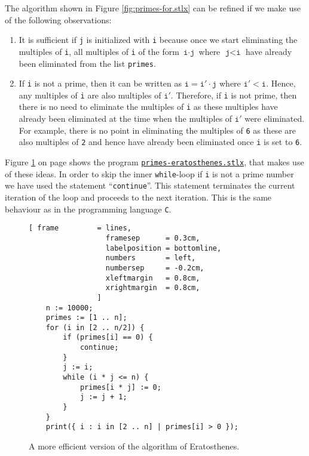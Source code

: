 The algorithm shown in Figure \ref{fig:primes-for.stlx} can be refined if we make use of the following observations:
\begin{enumerate}
\item It is sufficient if \texttt{j} is initialized with \texttt{i} because once we start eliminating the
      multiples of \texttt{i}, all multiples of \texttt{i} of the form $\texttt{i}\cdot\texttt{j}$ where
      $\texttt{j} < \texttt{i}$ have already been eliminated from the list \texttt{primes}. 
\item If \texttt{i} is not a prime, then it can be written as $\texttt{i} = \texttt{i}' \cdot\texttt{j}$ where
      $\texttt{i}' < \texttt{i}$.  Hence, any multiples of \texttt{i} are also multiples of $\texttt{i}'$.
      Therefore, if \texttt{i} is not prime, then there is no need to eliminate the multiples of
      \texttt{i} as these multiples have already been eliminated at the time when the multiples of
      $\texttt{i}'$ were eliminated.  For example, there is no point in eliminating the multiples of
      \texttt{6} as these are also multiples of \texttt{2} and hence have already been eliminated
      once \texttt{i} is set to \texttt{6}.
\end{enumerate}
Figure \ref{fig:primes-eratosthenes.stlx} on page \pageref{fig:primes-eratosthenes.stlx} shows the program
\href{https://github.com/karlstroetmann/Logik/blob/master/SetlX/primes-eratosthenes.stlx}{\texttt{primes-eratosthenes.stlx}}, 
that makes use of these ideas.  In order to skip the inner \texttt{while}-loop if \texttt{i} is not
a prime number we have used the statement ``\texttt{continue}''.  This statement terminates the
current iteration of the loop and proceeds to the next iteration.  This is the same behaviour as in
the programming language \texttt{C}. 


\begin{figure}[!ht]
  \centering
\begin{Verbatim}[ frame         = lines, 
                  framesep      = 0.3cm, 
                  labelposition = bottomline,
                  numbers       = left,
                  numbersep     = -0.2cm,
                  xleftmargin   = 0.8cm,
                  xrightmargin  = 0.8cm,
                ]
    n := 10000;
    primes := [1 .. n];
    for (i in [2 .. n/2]) {
        if (primes[i] == 0) {
            continue;
        }
        j := i;
        while (i * j <= n) {
            primes[i * j] := 0;
            j := j + 1;
        }
    }
    print({ i : i in [2 .. n] | primes[i] > 0 });
\end{Verbatim} 
\vspace*{-0.3cm}
\caption{A more efficient version of the algorithm of Eratosthenes.}  \label{fig:primes-eratosthenes.stlx}
\end{figure}


